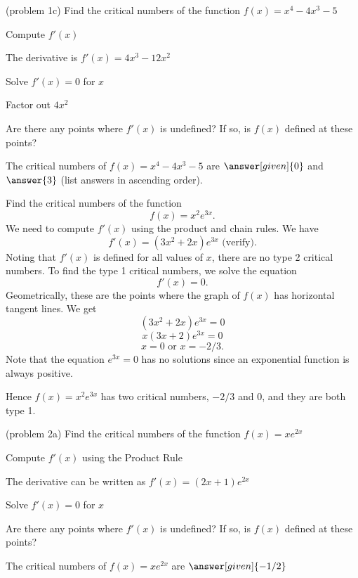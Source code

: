 \documentclass{ximera}
\begin{document}
\begin{problem}(problem 1c)
  Find the critical numbers of the function $f(x) = x^4 - 4x^3 - 5$
  
    \begin{hint}
      Compute $f'(x)$
    \end{hint}
    \begin{hint}
      The derivative is $f'(x) = 4x^3 - 12x^2$
    \end{hint}
		\begin{hint}
      Solve $f'(x) = 0$ for $x$
    \end{hint}
		\begin{hint}
      Factor out $4x^2$
    \end{hint}
    \begin{hint}
      Are there any points where $f'(x)$ is undefined?
      If so, is $f(x)$ defined at these points?  
		\end{hint}
    
    
		The critical numbers of $f(x) = x^4 - 4x^3 - 5$ are
		 $\answer[given]{0}$ and $\answer{3}$ (list answers in ascending order).
		
\end{problem}




\begin{example}[example 2] Find the critical numbers of the function 
\[f(x) = x^2e^{3x}.\]
We need to compute $f'(x)$ using the product and chain rules.  We have
\[f'(x) = (3x^2 +2x)e^{3x} \mbox{   (verify)}.\]
Noting that $f'(x)$ is defined for all values of $x$, there are no type 2 critical numbers.
To find the type 1 critical numbers, we solve the equation
\[f'(x) = 0.\]
Geometrically, these are the points where the graph of $f(x)$ has horizontal tangent lines.
We get
\[ (3x^2 +2x)e^{3x} =0\]
\[ x(3x+2)e^{3x} =0\]
\[x = 0 \mbox{   or   }  x = -2/3.\]
Note that the equation $e^{3x} = 0$ has no solutions since an exponential function is always positive.

Hence $f(x) = x^2e^{3x}$ has two critical numbers, $-2/3$ and $0$, and they are both type 1. 
\end{example}

\begin{problem}(problem 2a)
  Find the critical numbers of the function $f(x) = xe^{2x}$
  
  
    \begin{hint}
      Compute $f'(x)$ using the Product Rule
    \end{hint}
    \begin{hint}
      The derivative can be written as $f'(x) = (2x + 1)e^{2x}$
    \end{hint}
		\begin{hint}
      Solve $f'(x) = 0$ for $x$
    \end{hint}
    \begin{hint}
      Are there any points where $f'(x)$ is undefined?
      If so, is $f(x)$ defined at these points?  
		\end{hint}
    
    
		The critical numbers of $f(x) = xe^{2x}$ are
		 $\answer[given]{-1/2}$
		
\end{problem}
\end{document}
